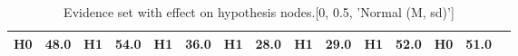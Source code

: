 \begin{table}
\begin{tabular}{c|cc|cc|cc|cc|cc|cc|cc}
\cellcolor{Bittersweet}H0&\cellcolor{Bittersweet}48.0&\cellcolor{Bittersweet}H1&\cellcolor{Bittersweet}54.0&\cellcolor{Bittersweet}H1&\cellcolor{Bittersweet}36.0&\cellcolor{Bittersweet}H1&\cellcolor{Bittersweet}28.0&\cellcolor{Bittersweet}H1&\cellcolor{Bittersweet}29.0&\cellcolor{Bittersweet}H1&\cellcolor{Bittersweet}52.0&\cellcolor{Bittersweet}H0&\cellcolor{Bittersweet}51.0\\\bottomrule\end{tabular}\caption{Evidence set with effect on hypothesis nodes.[0, 0.5, 'Normal (M, sd)']}\end{table}